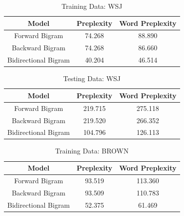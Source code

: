 \documentclass[journal, a4paper]{IEEEtran}
\begin{document}
\vspace{-7mm}	
	\begin{table}[!hbt]
		\begin{center}
		\caption{Training Data: WSJ}
		\label{tab:3}
		\begin{tabular}{|c|c|c|}
			\hline
			Model & Preplexity & Word Preplexity\\
			\hline
			 Forward Bigram &74.268  & 88.890 \\ \hline
			 Backward Bigram  & 74.268 &  86.660 \\ \hline
			Bidirectional Bigram & 40.204 & 46.514 \\
			\hline
		\end{tabular}
		\end{center}
	\end{table}
\vspace{-7mm}	
	\begin{table}[!hbt]
		\begin{center}
		\caption{Testing Data: WSJ}
		\label{tab:4}
		\begin{tabular}{|c|c|c|}
			\hline
			Model & Preplexity & Word Preplexity\\
			\hline
			 Forward Bigram &219.715  & 275.118 \\ \hline
			 Backward Bigram  & 219.520 &  266.352 \\ \hline
			Bidirectional Bigram & 104.796 & 126.113 \\
			\hline
		\end{tabular}
		\end{center}
	\end{table}

	\begin{table}[!hbt]
		\begin{center}
		\caption{Training Data: BROWN}
		\label{tab:5}
		\begin{tabular}{|c|c|c|}
			\hline
			Model & Preplexity & Word Preplexity\\
			\hline
			 Forward Bigram & 93.519  & 113.360 \\ \hline
			 Backward Bigram  & 93.509 &  110.783 \\ \hline
			Bidirectional Bigram & 52.375 & 61.469 \\
			\hline
		\end{tabular}
		\end{center}
	\end{table}
\end{document}
